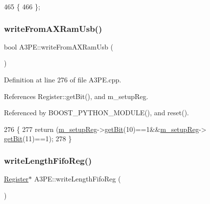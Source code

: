 \begin{DoxyCode}
465                  \{
466   \};
\end{DoxyCode}
\mbox{\label{classA3PE_a3b4333f547a2a36fc1f38bf4ca9afa89}} 
\subsubsection{\texorpdfstring{write\+From\+A\+X\+Ram\+Usb()}{writeFromAXRamUsb()}}
{\footnotesize\ttfamily bool A3\+P\+E\+::write\+From\+A\+X\+Ram\+Usb (\begin{DoxyParamCaption}{ }\end{DoxyParamCaption})}



Definition at line 276 of file A3\+P\+E.\+cpp.



References Register\+::get\+Bit(), and m\+\_\+setup\+Reg.



Referenced by B\+O\+O\+S\+T\+\_\+\+P\+Y\+T\+H\+O\+N\+\_\+\+M\+O\+D\+U\+L\+E(), and reset().


\begin{DoxyCode}
276                             \{
277   \textcolor{keywordflow}{return} (\hyperlink{classA3PE_a142fa10b7e705c4701ae21678ec2ec8a}{m\_setupReg}->\hyperlink{classRegister_a5d27c9ff548817eee097ba4fdc8e8f69}{getBit}(10)==1&&\hyperlink{classA3PE_a142fa10b7e705c4701ae21678ec2ec8a}{m\_setupReg}->
      \hyperlink{classRegister_a5d27c9ff548817eee097ba4fdc8e8f69}{getBit}(11)==1);
278 \}
\end{DoxyCode}
\mbox{\label{classA3PE_a3b75531731fc939206cce076f7ac9f9a}} 
\subsubsection{\texorpdfstring{write\+Length\+Fifo\+Reg()}{writeLengthFifoReg()}}
{\footnotesize\ttfamily \hyperlink{classRegister}{Register}$\ast$ A3\+P\+E\+::write\+Length\+Fifo\+Reg (\begin{DoxyParamCaption}{ }\end{DoxyParamCaption})\hspace{0.3cm}{\ttfamily [inline]}}



